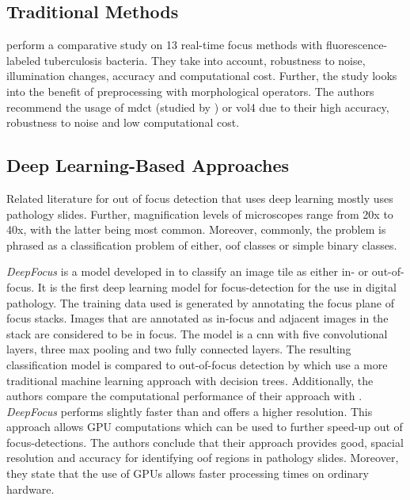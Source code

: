 \subsection{Traditional Methods}
\label{sec:Foundations:RelatedWorks:Traditional}


\textcite{mateos-perez2012comparative} perform a comparative study on 13 real-time focus methods with fluorescence-labeled tuberculosis bacteria. They take into account, robustness to noise, illumination changes, accuracy and computational cost. Further, the study looks into the benefit of preprocessing with morphological operators.
The authors recommend the usage of \ac{mdct} (studied by \textcite{lee2008enhanced}) or \ac{vol4} \cite{vollath1988influence} due to their high accuracy, robustness to noise and low computational cost.


\subsection{Deep Learning-Based Approaches}
\label{sec:Foundations:RelatedWorks:DeepLearning}

Related literature for out of focus detection that uses deep learning mostly uses pathology slides. Further, magnification levels of microscopes range from 20x to 40x, with the latter being most common. Moreover, commonly, the problem is phrased as a classification problem of either, \ac{oof} classes or simple binary classes.

\emph{DeepFocus} is a model developed in \textcite{senaras2018deepfocus} to classify an image tile as either in- or out-of-focus. It is the first deep learning model for focus-detection for the use in digital pathology. The training data used is generated by annotating the focus plane of focus stacks. Images that are annotated as in-focus and adjacent images in the stack are considered to be in focus. The model is a \ac{cnn} with five convolutional layers, three max pooling and two fully connected layers. The resulting classification model is compared to out-of-focus detection by \textcite{moleslopez2013automated} which use a more traditional machine learning approach with decision trees.
Additionally, the authors compare the computational performance of their approach with \textcite{moleslopez2013automated}. \emph{DeepFocus} performs slightly faster than \textcite{moleslopez2013automated} and offers a higher resolution. This approach allows GPU computations which can be used to further speed-up out of focus-detections.
The authors conclude that their approach provides good, spacial resolution and accuracy for identifying \ac{oof} regions in pathology slides. Moreover, they state that the use of GPUs allows faster processing times on ordinary hardware.

